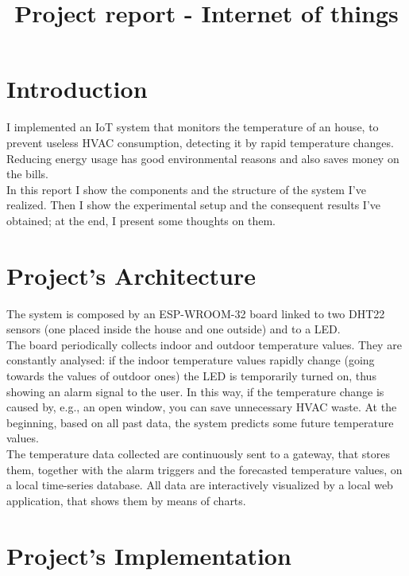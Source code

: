 \documentclass[conference]{IEEEtran}
\begin{document}
\title{Project report - Internet of things}

\author{
}

\maketitle


\section{Introduction}
I implemented an IoT system that monitors the temperature of an house, to prevent useless HVAC consumption, detecting it by rapid temperature changes. Reducing energy usage has good environmental reasons and also saves money on the bills.\\
In this report I show the components and the structure of the system I've realized. Then I show the experimental setup and the consequent results I've obtained; at the end, I present some thoughts on them.


\section{Project’s Architecture}
The system is composed by an ESP-WROOM-32 board linked to two DHT22 sensors (one placed inside the house and one outside) and to a LED.\\
The board periodically collects indoor and outdoor temperature values. They are constantly analysed: if the indoor temperature values rapidly change (going towards the values of outdoor ones) the LED is temporarily turned on, thus showing an alarm signal to the user. In this way, if the temperature change is caused by, e.g., an open window, you can save unnecessary HVAC waste. At the beginning, based on all past data, the system predicts some future temperature values.\\
The temperature data collected are continuously sent to a gateway, that stores them, together with the alarm triggers and the forecasted temperature values, on a local time-series database. All data are interactively visualized by a local web application, that shows them by means of charts.


\section{Project’s Implementation}
\end{document}
